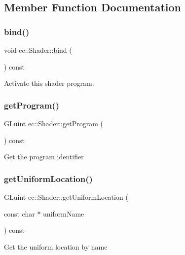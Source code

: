 \subsection{Member Function Documentation}
\mbox{\label{classec_1_1_shader_aa845ca62b0ccfbe7a07440fdf7641147}} 
\subsubsection{\texorpdfstring{bind()}{bind()}}
{\footnotesize\ttfamily void ec\+::\+Shader\+::bind (\begin{DoxyParamCaption}{ }\end{DoxyParamCaption}) const}

Activate this shader program. \mbox{\label{classec_1_1_shader_a54164ed1a5d74d390f70bcfa59aa8799}} 
\subsubsection{\texorpdfstring{get\+Program()}{getProgram()}}
{\footnotesize\ttfamily G\+Luint ec\+::\+Shader\+::get\+Program (\begin{DoxyParamCaption}{ }\end{DoxyParamCaption}) const}

Get the program identifier \mbox{\label{classec_1_1_shader_a90fc22094d5f262c31e03066b71a88e1}} 
\subsubsection{\texorpdfstring{get\+Uniform\+Location()}{getUniformLocation()}}
{\footnotesize\ttfamily G\+Luint ec\+::\+Shader\+::get\+Uniform\+Location (\begin{DoxyParamCaption}\item[{const char $\ast$}]{uniform\+Name }\end{DoxyParamCaption}) const}

Get the uniform location by name \mbox{\label{classec_1_1_shader_a0705647decc2663477c0abad943490bc}} 
